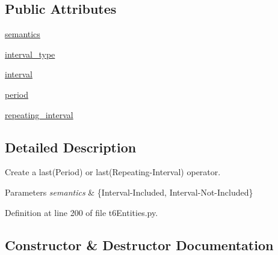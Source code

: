 \subsection*{Public Attributes}
\begin{DoxyCompactItemize}
\item 
\hyperlink{classtask6_1_1t6Entities_1_1T6LastOperator_ace165f371e06ffdd35e81589f7e3ad4c}{semantics}
\item 
\hyperlink{classtask6_1_1t6Entities_1_1T6LastOperator_a5aeed327adbf129c1493d5782bd6afd4}{interval\+\_\+type}
\item 
\hyperlink{classtask6_1_1t6Entities_1_1T6LastOperator_aca10c8da0b6eea3185f66f103dca0a29}{interval}
\item 
\hyperlink{classtask6_1_1t6Entities_1_1T6LastOperator_ac165233979c84dfa138d76b67d171b1a}{period}
\item 
\hyperlink{classtask6_1_1t6Entities_1_1T6LastOperator_ab58d042c2aeff54eb56b7298375cb15b}{repeating\+\_\+interval}
\end{DoxyCompactItemize}


\subsection{Detailed Description}
Create a last(\+Period) or last(Repeating-\/\+Interval) operator. 


\begin{DoxyParams}{Parameters}
{\em semantics} & \{Interval-\/\+Included, Interval-\/\+Not-\/\+Included\} \\
\hline
\end{DoxyParams}


Definition at line 200 of file t6\+Entities.\+py.



\subsection{Constructor \& Destructor Documentation}
\mbox{\label{classtask6_1_1t6Entities_1_1T6LastOperator_a16b9eca4b13c34d4615c7a654d30b501}} 
